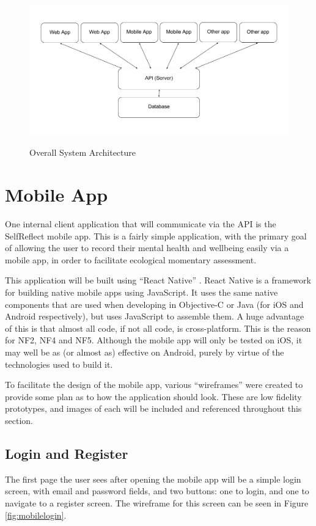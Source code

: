 \documentclass[11pt,openright,a4paper]{report}
\begin{document}
\begin{figure}[ht]
\centering
\caption{Overall System Architecture}
\includegraphics[width=\textwidth]{i/OverallSystem.png}
\label{fig:OverallSystem}
\end{figure}

\newpage
\section{Mobile App}
One internal client application that will communicate via the API is the SelfReflect mobile app. This is a fairly simple application, with the primary goal of allowing the user to record their mental health and wellbeing easily via a mobile app, in order to facilitate ecological momentary assessment.

This application will be built using \enquote{React Native} \parencite{reactnative}. React Native is a framework for building native mobile apps using JavaScript. It uses the same native components that are used when developing in Objective-C or Java (for iOS and Android respectively), but uses JavaScript to assemble them. A huge advantage of this is that almost all code, if not all code, is cross-platform. This is the reason for NF2, NF4 and NF5. Although the mobile app will only be tested on iOS, it may well be as (or almost as) effective on Android, purely by virtue of the technologies used to build it.

To facilitate the design of the mobile app, various \enquote{wireframes} were created to provide some plan as to how the application should look. These are low fidelity prototypes, and images of each will be included and referenced throughout this section.

\subsection{Login and Register}
The first page the user sees after opening the mobile app will be a simple login screen, with email and password fields, and two buttons: one to login, and one to navigate to a register screen. The wireframe for this screen can be seen in Figure \ref{fig:mobilelogin}.
\end{document}
